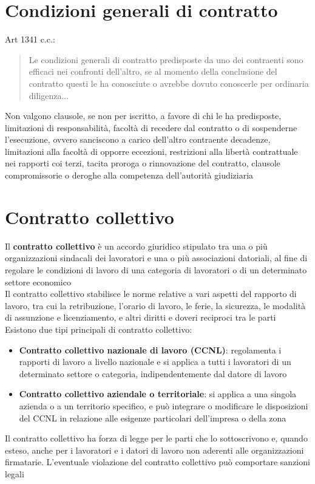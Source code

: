 \documentclass[8pt,oneside,a4paper]{article}
\begin{document}
	\section{Condizioni generali di contratto}
	Art 1341 c.c.:
	\begin{quote}
		Le condizioni generali di contratto predisposte da uno dei contraenti sono efficaci nei confronti dell'altro, se al momento della conclusione del contratto questi le ha conosciute o avrebbe dovuto conoscerle per ordinaria diligenza...
	\end{quote}
	Non valgono clausole, se non per iscritto, a favore di chi le ha predisposte, limitazioni di responsabilità, facoltà di recedere dal contratto o di sospenderne l'esecuzione, ovvero sanciscono a carico dell'altro contraente decadenze, limitazioni alla facoltà di opporre eccezioni, restrizioni alla libertà contrattuale nei rapporti coi terzi, tacita proroga o rinnovazione del contratto, clausole compromissorie o deroghe alla competenza dell'autorità giudiziaria
	\section{Contratto collettivo}
	Il \textbf{contratto collettivo} è un accordo giuridico stipulato tra una o più organizzazioni sindacali dei lavoratori e una o più associazioni datoriali, al fine di regolare le condizioni di lavoro di una categoria di lavoratori o di un determinato settore economico\\
	Il contratto collettivo stabilisce le norme relative a vari aspetti del rapporto di lavoro, tra cui la retribuzione, l’orario di lavoro, le ferie, la sicurezza, le modalità di assunzione e licenziamento, e altri diritti e doveri reciproci tra le parti\\
	Esistono due tipi principali di contratto collettivo:
	\begin{itemize}
		\item \textbf{Contratto collettivo nazionale di lavoro (CCNL)}: regolamenta i rapporti di lavoro a livello nazionale e si applica a tutti i lavoratori di un determinato settore o categoria, indipendentemente dal datore di lavoro
		\item \textbf{Contratto collettivo aziendale o territoriale}: si applica a una singola azienda o a un territorio specifico, e può integrare o modificare le disposizioni del CCNL in relazione alle esigenze particolari dell’impresa o della zona
	\end{itemize}
	Il contratto collettivo ha forza di legge per le parti che lo sottoscrivono e, quando esteso, anche per i lavoratori e i datori di lavoro non aderenti alle organizzazioni firmatarie. L'eventuale violazione del contratto collettivo può comportare sanzioni legali
\end{document}
